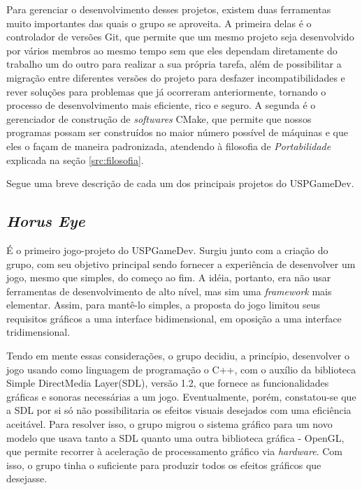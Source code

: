 \documentclass[12pt,onecolumn,a4paper]{article}
\begin{document}
    Para gerenciar o desenvolvimento desses projetos, existem duas ferramentas muito importantes das
    quais o grupo se aproveita. A primeira delas é o controlador de versões Git, que permite que um
    mesmo projeto seja desenvolvido por vários membros ao mesmo tempo sem que eles dependam
    diretamente do trabalho um do outro para realizar a sua própria tarefa, além de possibilitar a
    migração entre diferentes versões do projeto para desfazer incompatibilidades e rever soluções
    para problemas que já ocorreram anteriormente, tornando o processo de desenvolvimento mais
    eficiente, rico e seguro. A segunda é o gerenciador de construção de \textit{softwares} CMake,
    que permite que nossos programas possam ser construídos no maior número possível de máquinas e
    que eles o façam de maneira padronizada, atendendo à filosofia de \textit{Portabilidade}
    explicada na seção \ref{src:filosofia}.
    
    Segue uma breve descrição de cada um dos principais projetos do USPGameDev.
    
    \clearpage
    \subsection{\textit{Horus Eye}}
    \label{sec:horus}
        É o primeiro jogo-projeto do USPGameDev. Surgiu junto com a criação do grupo, com seu
        objetivo principal sendo fornecer a experiência de desenvolver um jogo, mesmo que simples,
        do começo ao fim. A idéia, portanto, era não usar ferramentas de desenvolvimento de alto
        nível, mas sim uma \textit{framework} mais elementar. Assim, para mantê-lo simples, a
        proposta do jogo limitou seus requisitos gráficos a uma interface bidimensional, em oposição
        a uma interface tridimensional.
        
        Tendo em mente essas considerações, o grupo decidiu, a princípio, desenvolver o jogo usando
        como linguagem de programação o C++\footnotemark, com o auxílio da biblioteca Simple
        DirectMedia Layer\footnotemark (SDL), versão 1.2, que fornece as funcionalidades gráficas e
        sonoras necessárias a um jogo. Eventualmente, porém, constatou-se que a SDL por si só não
        possibilitaria os efeitos visuais desejados com uma eficiência aceitável. Para resolver
        isso, o grupo migrou o sistema gráfico para um novo modelo que usava tanto a SDL quanto uma
        outra biblioteca gráfica - OpenGL\footnotemark, que permite recorrer à aceleração de
        processamento gráfico via \textit{hardware}. Com isso, o grupo tinha o suficiente para
        produzir todos os efeitos gráficos que desejasse.
        
\end{document}
